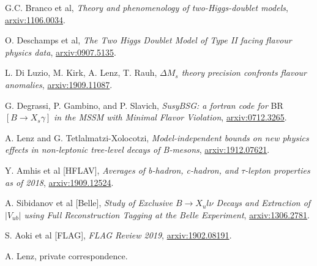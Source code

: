 \documentclass[a4paper,12pt]{article}
\begin{document}
\begin{thebibliography}{99}
G.C. Branco et al, \emph{Theory and phenomenology of two-Higgs-doublet models}, \href{https://arxiv.org/pdf/1106.0034.pdf}{arxiv:1106.0034}.

O. Deschamps et al, \emph{The Two Higgs Doublet Model of Type II facing flavour physics data}, \href{https://arxiv.org/pdf/0907.5135.pdf}{arxiv:0907.5135}.

L. Di Luzio, M. Kirk, A. Lenz, T. Rauh, \emph{$\Delta M_s$ theory precision confronts flavour anomalies}, \href{https://arxiv.org/pdf/1909.11087.pdf}{arxiv:1909.11087}.

G. Degrassi, P. Gambino, and P. Slavich, \emph{SusyBSG: a fortran code for} BR$[B\to X_s\gamma]$ \emph{in the MSSM with Minimal Flavor Violation}, \href{https://arxiv.org/pdf/0712.3265.pdf}{arxiv:0712.3265}.

A. Lenz and G. Tetlalmatzi-Xolocotzi, \emph{Model-independent bounds on new physics effects in non-leptonic tree-level decays of B-mesons}, \href{https://arxiv.org/pdf/1912.07621.pdf}{arxiv:1912.07621}.

Y. Amhis et al [HFLAV], \emph{Averages of b-hadron, c-hadron, and $\tau$-lepton properties as of 2018}, \href{https://arxiv.org/pdf/1909.12524.pdf}{arxiv:1909.12524}.

A. Sibidanov et al [Belle], \emph{Study of Exclusive $B\to X_ul\nu$ Decays and Extraction of $|V_{ub}|$ using Full Reconstruction Tagging at the Belle Experiment}, \href{https://arxiv.org/pdf/1306.2781.pdf}{arxiv:1306.2781}.

S. Aoki et al [FLAG], \emph{FLAG Review 2019}, \href{https://arxiv.org/pdf/1902.08191.pdf}{arxiv:1902.08191}.

A. Lenz, private correspondence.




\end{thebibliography}
\end{document}
